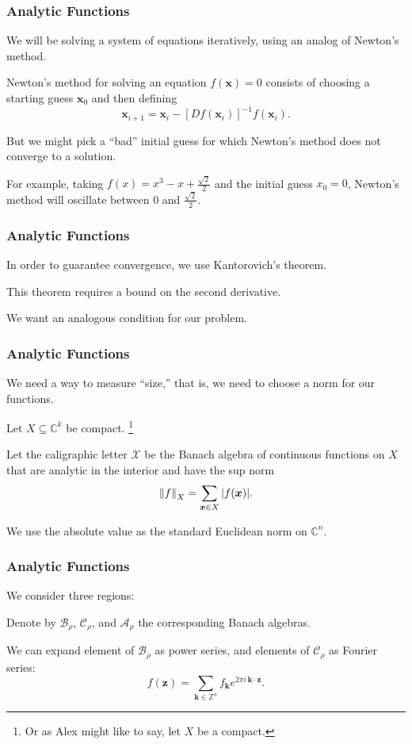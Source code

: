 \documentclass{beamer}
\newcommand{\Z}{\mathbb{Z}}
\newcommand{\C}{\mathbb{C}}
\newcommand{\bp}[1]{\bm{#1}}
\newcommand{\genericdel}[4]{%
  \ifcase#3\relax
  #1#4#2\or
  \bigl#1#4\bigr#2\or
  \Bigl#1#4\Bigr#2\or
  \biggl#1#4\biggr#2\or
  \Biggl#1#4\Biggr#2\else
  \left#1#4\right#2\fi
}
\newcommand{\enVert}[2][-1]{\genericdel\|\|{#1}{#2}}
\let\norm\enVert
\begin{document}
\begin{frame}
  \frametitle{Analytic Functions}

  We will be solving a system of equations iteratively, using an analog of
  Newton's method.
  
  Newton's method for solving an equation $f(\bp{x}) = 0$ consists of choosing a
  starting guess $\bp{x}_0$ and then defining
  \begin{equation*}
    \bp{x}_{i+1} = \bp{x}_i - [Df(\bp{x}_i)]^{-1} f(\bp{x}_i).
  \end{equation*}

  But we might pick a ``bad'' initial guess for which Newton's method does not
  converge to a solution.

  For example, taking $f(x) = x^3 - x + \frac{\sqrt{2}}{2}$ and the initial
  guess $x_0 = 0$, Newton's method will oscillate between $0$ and
  $\frac{\sqrt{2}}{2}$.
\end{frame}

\begin{frame}
  \frametitle{Analytic Functions}
  In order to guarantee convergence, we use Kantorovich's theorem.

  This theorem requires a bound on the second derivative.

  We want an analogous condition for our problem.
\end{frame}

\begin{frame}
  \frametitle{Analytic Functions}
  We need a way to measure ``size,'' that is, we need to choose a norm for our
  functions.

  Let $X \subseteq \C^k$ be compact.
  \footnote{ Or as Alex might like to say, let $X$ be a compact.}

  Let the caligraphic letter $\mathcal{X}$ be the Banach algebra of continuous
  functions on $X$ that are analytic in the interior and have the sup norm
  \begin{equation*}
    \norm{f}_X = \sum_{\bp{x} \in X} |f(\bp{x})|.
  \end{equation*}

  We use the absolute value as the standard Euclidean norm on $\C^n$.
\end{frame}

\begin{frame}
  \frametitle{Analytic Functions}
  We consider three regions:
  \domains{}

  Denote by $\mathcal{B}_\rho$, $\mathcal{C}_\rho$, and $\mathcal{A}_\rho$ the
  corresponding Banach algebras.

  We can expand element of $\mathcal{B}_{\rho}$ as power series, and elements of
  $\mathcal{C}_{\rho}$ as Fourier series:
  \begin{equation*}
    f(\bp{z}) = \sum_{\bp{k} \in \Z^n} f_{\bp{k}} e^{2 \pi i \, \bp{k} \cdot \bp{z}}.
  \end{equation*}
\end{frame}
\end{document}
